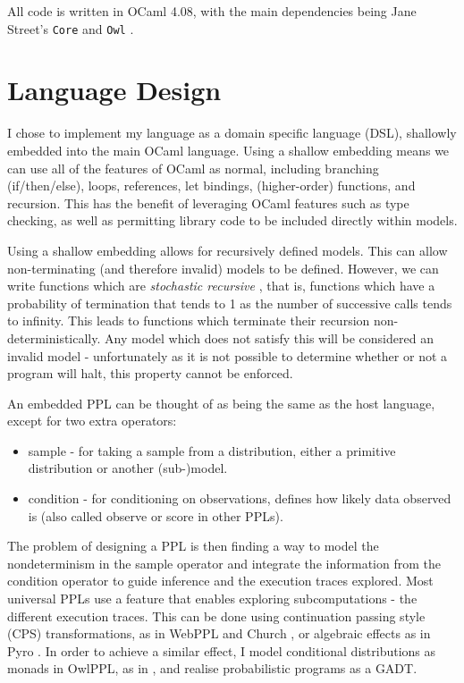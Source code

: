 All code is written in OCaml 4.08, with the main dependencies being Jane Street's \texttt{Core} and \texttt{Owl} \cite{owl}.	
	
\section{Language Design}
I chose to implement my language as a domain specific language (DSL), shallowly embedded into the main OCaml language. Using a shallow embedding means we can use all of the features of OCaml as normal, including branching (if/then/else), loops, references, let bindings, (higher-order) functions, and recursion. This has the benefit of leveraging OCaml features such as type checking, as well as permitting library code to be included directly within models.

Using a shallow embedding allows for recursively defined models. This can allow non-terminating (and therefore invalid) models to be defined. However, we can write functions which are \textit{stochastic recursive} \cite{siegmund}, that is, functions which have a probability of termination that tends to 1 as the number of successive calls tends to infinity. This leads to functions which terminate their recursion non-deterministically. Any model which does not satisfy this will be considered an invalid model - unfortunately as it is not possible to determine whether or not a program will halt, this property cannot be enforced. 
	
An embedded PPL can be thought of as being the same as the host language, except for two extra operators:
\begin{itemize}
	\item sample - for taking a sample from a distribution, either a primitive distribution or another (sub-)model.
	\item condition - for conditioning on observations, defines how likely data observed is (also called observe or score in other PPLs).
\end{itemize}
The problem of designing a PPL is then finding a way to model the nondeterminism in the sample operator and integrate the information from the condition operator to guide inference and the execution traces explored. Most universal PPLs use a feature that enables exploring subcomputations - the different execution traces. This can be done using continuation passing style (CPS) transformations, as in WebPPL and Church \cite{mobus2018structure,goodman2012church}, or algebraic effects as in Pyro \cite{bingham2019pyro}. In order to achieve a similar effect, I model conditional distributions as monads in OwlPPL, as in \cite{scibior2015practical}, and realise probabilistic programs as a GADT.

